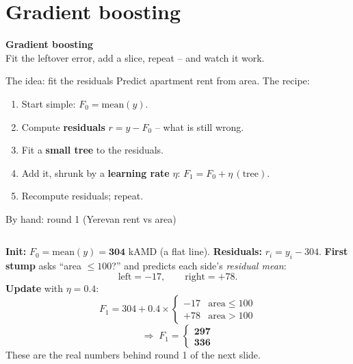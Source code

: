 \documentclass[aspectratio=169]{beamer}
\newcommand{\sectiontransition}[2]{%
  \begin{frame}[plain]
    \vfill
    \begin{center}
      {\Large\color{popblue}\textbf{#1}}\\[10pt]
      {\normalsize #2}
    \end{center}
    \vfill
  \end{frame}}
\begin{document}
\section{Gradient boosting}
\sectiontransition{Gradient boosting}{Fit the leftover error, add a slice, repeat -- and watch it work.}

\begin{frame}{The idea: fit the residuals}
  Predict apartment rent from area. The recipe:
  \begin{enumerate}\small
    \item Start simple: $F_0 = \text{mean}(y)$.
    \item Compute \textbf{residuals} $r = y - F_0$ -- what is still wrong.
    \item Fit a \textbf{small tree} to the residuals.
    \item Add it, shrunk by a \textbf{learning rate} $\eta$: $F_1 = F_0 + \eta\,(\text{tree})$.
    \item Recompute residuals; repeat.
  \end{enumerate}
  \vfill
\end{frame}

\begin{frame}{By hand: round 1 (Yerevan rent vs area)}
  \begin{columns}[T]
    \small
    \textbf{Init:} $F_0 = \text{mean}(y) = \mathbf{304}$ kAMD (a flat line).
    \vskip 3pt
    \textbf{Residuals:} $r_i = y_i - 304$.
    \vskip 3pt
    \textbf{First stump} asks ``area $\le 100$?'' and predicts each side's
    \emph{residual mean}:
    \[
      \text{left} = -17,\qquad \text{right} = +78 .
    \]
    \textbf{Update} with $\eta = 0.4$:
    \[
      F_1 = 304 + 0.4 \times
      \begin{cases} -17 & \text{area} \le 100 \\ +78 & \text{area} > 100 \end{cases}
    \]
    \[
      \Rightarrow\; F_1 = \begin{cases} \mathbf{297} \\ \mathbf{336} \end{cases}
    \]
    \vskip 12pt
    \vskip 6pt
    \footnotesize These are the real numbers behind round 1 of the next slide.
  \end{columns}
\end{frame}
\end{document}
